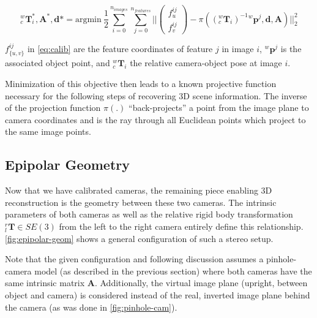 \documentclass[headsepline, hidelinks, footsepline, footinclude=false, oneside, fontsize=11pt, paper=a4, listof=totoc, bibliography=totoc]{scrbook}
\begin{document}
\begin{equation}
\label{eq:calib}
{}^w_c\mathbf{T}_i^*, \mathbf{A}^*, \mathbf{d}* = \text{argmin}~\frac{1}{2} \sum_{i=0}^{n_{images}}\sum_{j=0}^{n_{features}}||\begin{pmatrix}f^{ij}_u \\ f^{ij}_v \end{pmatrix} - \pi(({}^w_c\mathbf{T}_i)^{-1}{}^w\mathbf{p}^{j}, \mathbf{d}, \mathbf{A})||^2_2
\end{equation}

\(f^{ij}_{\{u, v\}}\) in \cref{eq:calib} are the feature coordinates of feature \(j\) in image \(i\), \({}^w\mathbf{p}^{j}\) is the associated object point, and \({}^w_c\mathbf{T}_i\) the relative camera-object pose at image \(i\).

Minimization of this objective then leads to a known projective function necessary for the following steps of recovering 3D scene information.
The inverse of the projection function \(\pi(.)\) ``back-projects'' a point from the image plane to camera coordinates and is the ray through all Euclidean points which project to the same image points.

\subsection{Epipolar Geometry \label{epipolar-geometry}}
\label{sec:org81b8b23}
    Now that we have calibrated cameras, the remaining piece enabling 3D reconstruction is the geometry between these two cameras.
The intrinsic parameters of both cameras as well as the relative rigid body transformation \({}^r_l\mathbf{T} \in  SE(3)\) from the left to the right camera entirely define this relationship. 
\cref{fig:epipolar-geom} shows a general configuration of such a stereo setup. 

Note that the given configuration and following discussion assumes a pinhole-camera model (as described in the previous section) where both cameras have the same intrinsic matrix \(\mathbf{A}\).
Additionally, the virtual image plane (upright, between object and camera) is considered instead of the real, inverted image plane behind the camera (as was done in \cref{fig:pinhole-cam}).
\end{document}
